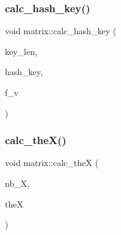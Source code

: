 \subsubsection{\texorpdfstring{calc\+\_\+hash\+\_\+key()}{calc\_hash\_key()}}
{\footnotesize\ttfamily void matrix\+::calc\+\_\+hash\+\_\+key (\begin{DoxyParamCaption}\item[{\mbox{\hyperlink{galois_8h_a09fddde158a3a20bd2dcadb609de11dc}{I\+NT}}}]{key\+\_\+len,  }\item[{\mbox{\hyperlink{classhollerith}{hollerith}} \&}]{hash\+\_\+key,  }\item[{\mbox{\hyperlink{galois_8h_a09fddde158a3a20bd2dcadb609de11dc}{I\+NT}}}]{f\+\_\+v }\end{DoxyParamCaption})}

\mbox{\label{classmatrix_abf772e9b3338df569be017ffecb165ef}} 
\subsubsection{\texorpdfstring{calc\+\_\+the\+X()}{calc\_theX()}}
{\footnotesize\ttfamily void matrix\+::calc\+\_\+theX (\begin{DoxyParamCaption}\item[{\mbox{\hyperlink{galois_8h_a09fddde158a3a20bd2dcadb609de11dc}{I\+NT}} \&}]{nb\+\_\+X,  }\item[{\mbox{\hyperlink{galois_8h_a09fddde158a3a20bd2dcadb609de11dc}{I\+NT}} $\ast$\&}]{theX }\end{DoxyParamCaption})}

\mbox{\label{classmatrix_a142f5c745cc0eda86c6fed61675f9e33}} 

